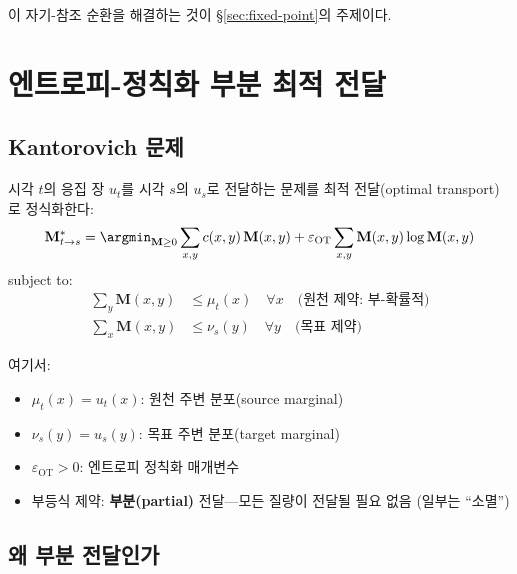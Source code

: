 \begin{center}
\end{center}

이 자기-참조 순환을 해결하는 것이 §\ref{sec:fixed-point}의 주제이다.


\section{엔트로피-정칙화 부분 최적 전달}
\label{sec:ot-sinkhorn}

\subsection{Kantorovich 문제}

시각 $t$의 응집 장 $u_t$를 시각 $s$의 $u_s$로 전달하는 문제를 최적 전달(optimal transport)로 정식화한다:
\begin{equation}
    \mathbf{M}^*_{t \to s} = \argmin_{\mathbf{M} \geq 0} \sum_{x,y} c(x,y)\, \mathbf{M}(x,y) + \varepsilon_{\mathrm{OT}} \sum_{x,y} \mathbf{M}(x,y) \log \mathbf{M}(x,y)
    \label{eq:kantorovich}
\end{equation}
subject to:
\begin{align}
    \sum_y \mathbf{M}(x,y) &\leq \mu_t(x) \quad \forall x \quad \text{(원천 제약: 부-확률적)} \label{eq:source-constraint} \\
    \sum_x \mathbf{M}(x,y) &\leq \nu_s(y) \quad \forall y \quad \text{(목표 제약)} \label{eq:target-constraint}
\end{align}

여기서:
\begin{itemize}
    \item $\mu_t(x) = u_t(x)$: 원천 주변 분포(source marginal)
    \item $\nu_s(y) = u_s(y)$: 목표 주변 분포(target marginal)
    \item $\varepsilon_{\mathrm{OT}} > 0$: 엔트로피 정칙화 매개변수
    \item 부등식 제약: \textbf{부분(partial)} 전달---모든 질량이 전달될 필요 없음 (일부는 ``소멸'')
\end{itemize}

\subsection{왜 부분 전달인가}

